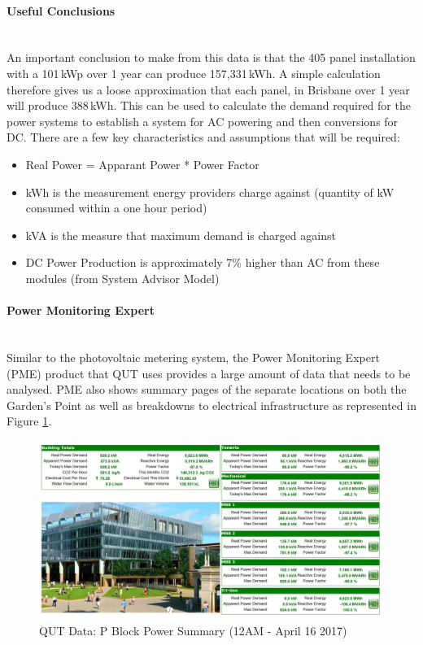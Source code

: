 \paragraph{Useful Conclusions}
~\\
An important conclusion to make from this data is that the 405 panel installation with a 101\,kWp over 1 year can produce 157,331\,kWh. A simple calculation therefore gives us a loose approximation that each panel, in Brisbane over 1 year will produce 388\,kWh. This can be used to calculate the demand required for the power systems to establish a system for AC powering and then conversions for DC. There are a few key characteristics and assumptions that will be required:
\newline
\begin{itemize}[noitemsep,nolistsep]
	\item Real Power = Apparant Power * Power Factor
	\item kWh is the measurement energy providers charge against (quantity of kW consumed within a one hour period)
	\item kVA is the measure that maximum demand is charged against
	\item DC Power Production is approximately 7\% higher than AC from these modules (from System Advisor Model)
\end{itemize} 

\newpage

\paragraph{Power Monitoring Expert}
~~\\
Similar to the photovoltaic metering system, the Power Monitoring Expert (PME) product that QUT uses provides a large amount of data that needs to be analysed. PME also shows summary pages of the separate locations on both the Garden's Point as well as breakdowns to electrical infrastructure as represented in Figure \ref{fig:qut-pme-pblock-summary}. 

\begin{figure}[H]
	\hfill\includegraphics[width = 150mm]{images/metering/pme/pme-p-block-summary-page}\hspace*{\fill}
	\caption{QUT Data: P Block Power Summary (12AM - April 16 2017)} 
	\label{fig:qut-pme-pblock-summary}
\end{figure} 

